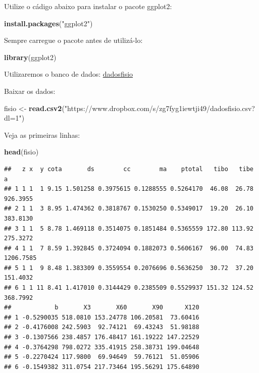 \documentclass[
]{book}
\newenvironment{Shaded}{\begin{snugshade}}{\end{snugshade}}
\newcommand{\KeywordTok}[1]{\textcolor[rgb]{0.13,0.29,0.53}{\textbf{#1}}}
\newcommand{\NormalTok}[1]{#1}
\newcommand{\StringTok}[1]{\textcolor[rgb]{0.31,0.60,0.02}{#1}}
\begin{document}
Utilize o cádigo abaixo para instalar o pacote ggplot2:

\begin{Shaded}
\begin{Highlighting}[]
\KeywordTok{install.packages}\NormalTok{(}\StringTok{"ggplot2"}\NormalTok{)}
\end{Highlighting}
\end{Shaded}

Sempre carregue o pacote antes de utilizá-lo:

\begin{Shaded}
\begin{Highlighting}[]
\KeywordTok{library}\NormalTok{(ggplot2)}
\end{Highlighting}
\end{Shaded}

Utilizaremos o banco de dados:
\href{https://www.dropbox.com/s/zg7fyg1iewtji49/dadosfisio.csv?dl=1}{dadosfisio}

Baixar os dados:

\begin{Shaded}
\begin{Highlighting}[]
\NormalTok{fisio <-}\StringTok{ }\KeywordTok{read.csv2}\NormalTok{(}\StringTok{"https://www.dropbox.com/s/zg7fyg1iewtji49/dadosfisio.csv?dl=1"}\NormalTok{)}
\end{Highlighting}
\end{Shaded}

Veja as primeiras linhas:

\begin{Shaded}
\begin{Highlighting}[]
\KeywordTok{head}\NormalTok{(fisio)}
\end{Highlighting}
\end{Shaded}

\begin{verbatim}
##   z x  y cota       ds        cc        ma    ptotal   tibo   tibe         a
## 1 1 1  1 9.15 1.501258 0.3975615 0.1288555 0.5264170  46.08  26.78  926.3955
## 2 1 1  3 8.95 1.474362 0.3818767 0.1530250 0.5349017  19.20  26.10  383.8130
## 3 1 1  5 8.78 1.469118 0.3514075 0.1851484 0.5365559 172.80 113.92  275.3272
## 4 1 1  7 8.59 1.392845 0.3724094 0.1882073 0.5606167  96.00  74.83 1206.7585
## 5 1 1  9 8.48 1.383309 0.3559554 0.2076696 0.5636250  30.72  37.20  151.4032
## 6 1 1 11 8.41 1.417010 0.3144429 0.2385509 0.5529937 151.32 124.52  368.7992
##            b       X3       X60       X90      X120
## 1 -0.5290035 518.0810 153.24778 106.20581  73.60416
## 2 -0.4176008 242.5903  92.74121  69.43243  51.98188
## 3 -0.1307566 238.4857 176.48417 161.19222 147.22529
## 4 -0.3764298 798.0272 335.41915 258.38731 199.04648
## 5 -0.2270424 117.9800  69.94649  59.76121  51.05906
## 6 -0.1549382 311.0754 217.73464 195.56291 175.64890
\end{verbatim}
\end{document}
